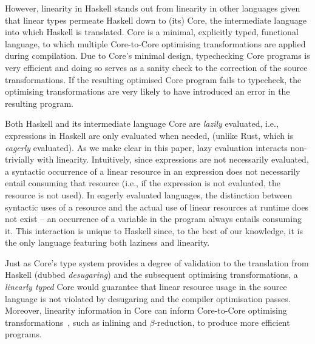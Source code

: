 \documentclass[acmsmall,review]{acmart}
\begin{document}
However, linearity in Haskell stands out from linearity in other
languages given that linear types permeate Haskell down to (its) Core,
the intermediate language into which Haskell is translated. Core is a
minimal, explicitly typed, functional language, to which multiple
Core-to-Core optimising transformations are applied during
compilation. Due to Core's minimal design, typechecking Core programs
is very efficient and doing so serves as a sanity check to the
correction of the source transformations. If the resulting optimised
Core program fails to typecheck, the optimising transformations are
very likely to have introduced an error in the resulting program.
%

Both Haskell and its intermediate language Core are \emph{lazily}
        evaluated, i.e., expressions in Haskell are only evaluated when needed,
        (unlike Rust, which is \emph{eagerly} evaluated).
        As we make clear in this paper, lazy evaluation interacts non-trivially with linearity.
        Intuitively, since expressions are not necessarily evaluated,
        a syntactic occurrence of a linear resource in an expression does not necessarily
        entail consuming that resource (i.e., if the expression is not evaluated,
        the resource is not used).
%
        In eagerly evaluated languages, the distinction between syntactic uses of a
        resource and the actual use of linear resources at runtime does not exist --
        an occurrence of a variable in the program always entails consuming it.
        This interaction is unique to Haskell since, to the best of
        our knowledge, it is the
        only language featuring both laziness and linearity.

Just as Core's type system provides a degree of validation to the
translation from Haskell (dubbed \emph{desugaring}) and the subsequent
optimising transformations, a \emph{linearly typed} Core would guarantee that
linear resource usage in the source language is not violated by desugaring
and the compiler optimisation passes. Moreover, linearity information in
Core can inform Core-to-Core optimising 
transformations~\cite{cite:let-floating,peytonjones1997a,cite:linearhaskell},
such as inlining and $\beta$-reduction, to produce more efficient programs.
%
%
\end{document}
